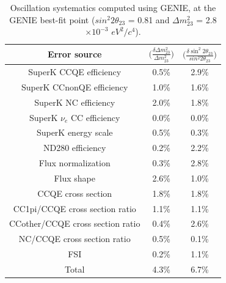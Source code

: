 \begin{table}[htb]
\center
\renewcommand{\arraystretch}{1.75} %
\begin{tabular}{|c|cc|}
\hline
Error source  &
  $\Big(\frac{\delta{\Delta m^{2}_{23}}}{\Delta m^{2}_{23}}\Big)$  & $\Big(\frac{\delta{\sin^{2}2\theta_{23}}}{sin^{2}2\theta_{23}}\Big)$  \\
\hline
SuperK CCQE efficiency            &   0.5\%   &   2.9\%      \\
SuperK CCnonQE efficiency         &   1.0\%   &   1.6\%      \\
SuperK NC efficiency              &   2.0\%   &   1.8\%      \\
SuperK $\nu_{e}$ CC efficiency    &   0.0\%   &   0.0\%      \\
SuperK energy scale               &   0.5\%   &   0.3\%      \\
ND280 efficiency                  &   0.2\%   &   2.2\%      \\
Flux normalization                &   0.3\%   &   2.8\%      \\
Flux shape                        &   2.6\%   &   1.0\%      \\
CCQE cross section                &   1.8\%   &   1.8\%      \\
CC1pi/CCQE cross section ratio    &   1.1\%   &   1.1\%      \\
CCother/CCQE cross section ratio  &   0.4\%   &   2.6\%      \\
NC/CCQE cross section ratio       &   0.5\%   &   0.1\%      \\
FSI                               &   0.2\%   &   1.1\%      \\
\hline
Total                             &   4.3\%   &   6.7\%      \\
\hline
\end{tabular}\\[2pt]
\caption{
  Oscillation systematics computed using GENIE, at the GENIE best-fit point
  ($sin^{2}2\theta_{23}$ = 0.81 and $\Delta m^{2}_{23}$ = 2.8$\times10^{-3}$ $eV^{2}/c^{4}$).
}
\label{table:oscsyst_at_genie_bestfit_point}
\end{table}


